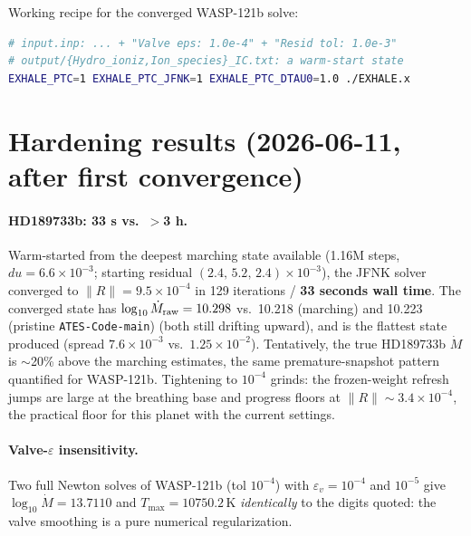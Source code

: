 \documentclass[english,a4paper]{my_memo}
\newcommand{\code}[1]{\texttt{#1}}
\begin{document}
\noindent Working recipe for the converged WASP-121b solve:
\begin{lstlisting}[language=bash]
# input.inp: ... + "Valve eps: 1.0e-4" + "Resid tol: 1.0e-3"
# output/{Hydro_ioniz,Ion_species}_IC.txt: a warm-start state
EXHALE_PTC=1 EXHALE_PTC_JFNK=1 EXHALE_PTC_DTAU0=1.0 ./EXHALE.x
\end{lstlisting}

\section{Hardening results (2026-06-11, after first convergence)}
\label{sec:hardening}

\paragraph{HD189733b: 33 s vs.\ $>$3 h.} Warm-started from the deepest
marching state available (1.16M steps, $du=6.6\times10^{-3}$; starting
residual $(2.4,\,5.2,\,2.4)\times10^{-3}$), the JFNK solver converged to
$\|R\|=9.5\times10^{-4}$ in 129 iterations / \textbf{33 seconds wall time}.
The converged state has $\log_{10}\dot M_{\rm raw}=10.298$ vs.\ 10.218
(marching) and 10.223 (pristine \code{ATES-Code-main}) (both still
drifting upward), and is the flattest state produced
(spread $7.6\times10^{-3}$ vs.\ $1.25\times10^{-2}$). Tentatively, the true
HD189733b $\dot M$ is $\sim$20\% above the marching estimates, the same
premature-snapshot pattern quantified for WASP-121b. Tightening to
$10^{-4}$ grinds: the frozen-weight refresh jumps are large at the
breathing base and progress floors at $\|R\|\sim3.4\times10^{-4}$,
the practical floor for this planet with the current settings.

\paragraph{Valve-$\varepsilon$ insensitivity.} Two full Newton solves of
WASP-121b (tol $10^{-4}$) with $\varepsilon_v=10^{-4}$ and $10^{-5}$ give
$\log_{10}\dot M = 13.7110$ and $T_{\max}=10750.2$\,K \emph{identically} to
the digits quoted: the valve smoothing is a pure numerical regularization.
\end{document}
